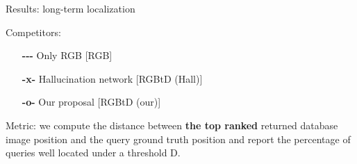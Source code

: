 \begin{frame}{Results: long-term localization}
\begin{minipage}{0.49\linewidth}
\begin{minipage}{0.49\linewidth}
		\end{minipage}
		\begin{minipage}{0.49\linewidth}
		   \scriptsize
			Competitors:
			\begin{itemize}
				\item[\textbf{-{}-{}-}] Only RGB [RGB]
				\item[\textbf{-x-}] Hallucination network [RGBtD (Hall)]
				\item[\textbf{-o-}] Our proposal [RGBtD (our)]
			\end{itemize}
		\end{minipage}
		\vspace{0.5cm}		
		
		Metric: we compute the distance between \textbf{the top ranked} returned database image position and the query ground truth position and report the percentage of queries well located under a threshold D.
	\end{minipage}
\end{frame}


